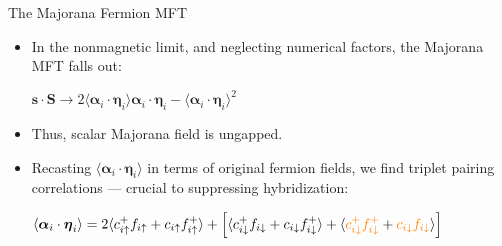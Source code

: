 \documentclass{beamer}
\begin{document}
\begin{frame}{The Majorana Fermion MFT}
    
    
    \begin{itemize}
        \item In the nonmagnetic limit, and neglecting numerical factors, the Majorana MFT falls out:

        \begin{center}
            $\boldsymbol s \cdot \boldsymbol S \to 2 \langle \boldsymbol\alpha_i \cdot \boldsymbol\eta_i\rangle \boldsymbol\alpha_i \cdot \boldsymbol\eta_i - \langle \boldsymbol\alpha_i \cdot \boldsymbol\eta_i\rangle^2$
        \end{center}
        
        \item Thus, scalar Majorana field is ungapped. 
        \item Recasting $\langle \boldsymbol\alpha_i \cdot \boldsymbol\eta_i\rangle$ in terms of original fermion fields, we find triplet pairing correlations --- crucial to suppressing hybridization:
        \begin{center}
            $\langle \boldsymbol\alpha_i \cdot \boldsymbol\eta_i\rangle = 2\langle c_{i\uparrow}^+f_{i\uparrow}+ c_{i\uparrow}f_{i\uparrow}^+ \rangle + \left[ 
            \langle c_{i\downarrow}^+f_{i\downarrow}+ c_{i\downarrow}f_{i\downarrow}^+ \rangle +
            \langle {\color{orange} c_{i\downarrow}^+f_{i\downarrow}^+} + {\color{orange}c_{i\downarrow}f_{i\downarrow}} \rangle
            \right]$
        \end{center}
        
    \end{itemize}
    
\end{frame}


\end{document}
